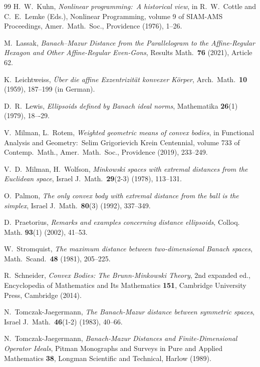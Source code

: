 \documentclass[12pt,a4paper]{article}
\theoremstyle{definition}
\begin{document}
\begin{thebibliography}{99}
 H.~W.~Kuhn, \emph{Nonlinear programming:~A historical view}, in R.~W.~Cottle and C.~E.~Lemke (Eds.), Nonlinear Programming, volume 9 of SIAM-AMS Proceedings, Amer.~Math.~Soc., Providence (1976), 1--26.

 M.~Lassak, \emph{Banach–Mazur Distance from the Parallelogram to the Affine-Regular Hexagon and Other Affine-Regular Even-Gons}, Results Math.~\textbf{76} (2021), Article 62.

 K.~Leichtweiss, \emph{\"Uber die affine Exzentrizit\"at konvexer K\"orper}, Arch.~Math.~\textbf{10} (1959), 187--199 (in German).

 D.~R.~Lewis, \emph{Ellipsoids defined by Banach ideal norms}, Mathematika \textbf{26}(1) (1979), 18–-29.

 V.~Milman, L.~Rotem, \emph{Weighted geometric means of convex bodies}, in Functional Analysis and Geometry:~Selim Grigorievich Krein Centennial, volume 733 of Contemp.~Math., Amer.~Math.~Soc., Providence (2019), 233--249.

 V.~D.~Milman, H.~Wolfson, \emph{Minkowski spaces with extremal distances from the Euclidean space}, Israel J.~Math.~\textbf{29}(2-3) (1978), 113--131.

 O.~Palmon, \emph{The only convex body with extremal distance from the ball is the simplex}, Israel J.~Math.~\textbf{80}(3) (1992), 337--349.

 D.~Praetorius, \emph{Remarks and examples concerning distance ellipsoids}, Colloq. Math. \textbf{93}(1) (2002), 41--53.

 W.~Stromquist, \emph{The maximum distance between two-dimensional Banach spaces}, Math.~Scand.~\textbf{48} (1981), 205--225.

 R.~Schneider, \emph{Convex Bodies: The Brunn-Minkowski Theory}, 2nd expanded ed., Encyclopedia of Mathematics and Its Mathematics \textbf{151}, Cambridge University Press, Cambridge (2014).

 N.~Tomczak-Jaegermann, \emph{The Banach-Mazur distance between symmetric spaces},  Israel J.~Math.~\textbf{46}(1-2) (1983), 40--66.

 N.~Tomczak-Jaegermann, \emph{Banach-Mazur Distances and Finite-Dimensional Operator Ideals}, Pitman Monographs and Surveys in Pure and Applied Mathematics \textbf{38}, Longman Scientific and Technical, Harlow (1989).

\end{thebibliography}
\end{document}
